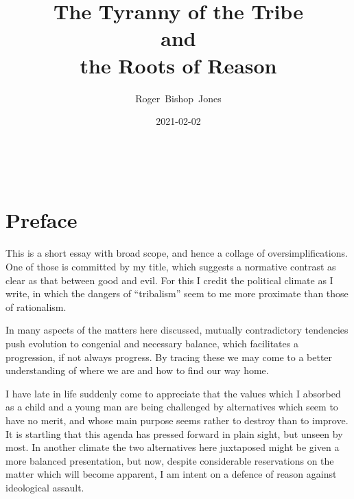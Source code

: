 \documentclass[10pt,titlepage]{article}
\title{\bf\LARGE The Tyranny of the Tribe\\and\\the Roots of Reason}
\author{Roger~Bishop~Jones}
\date{\small 2021-02-02}
\newcommand{\ignore}[1]{}
\begin{document}
%
% 
                               
\begin{titlepage}
\maketitle





\end{titlepage}

\ \

\ignore{
\begin{centering}
{}
\end{centering}
}%

\setcounter{tocdepth}{4}
{\parskip-0pt\tableofcontents}


\pagebreak

\section*{Preface}


This is a short essay with broad scope, and hence a collage of oversimplifications.
One of those is committed by my title, which suggests a normative contrast as clear as that between good and evil.
For this I credit the political climate as I write, in which the dangers of ``tribalism'' seem to me more proximate than those of rationalism.

In many aspects of the matters here discussed, mutually contradictory tendencies push evolution to congenial and necessary balance, which facilitates a progression, if not always progress.
By tracing these we may come to a better understanding of where we are and how to find our way home.

I have late in life suddenly come to appreciate that the values which I absorbed as a child and a young man are being challenged by alternatives which seem to have no merit, and whose main purpose seems rather to destroy than to improve.
It is startling that this agenda has pressed forward in plain sight, but unseen by most.
In another climate the two alternatives here juxtaposed might be given a more balanced presentation, but now, despite considerable reservations on the matter which will become apparent, I am intent on a defence of reason against ideological assault.
\end{document}
